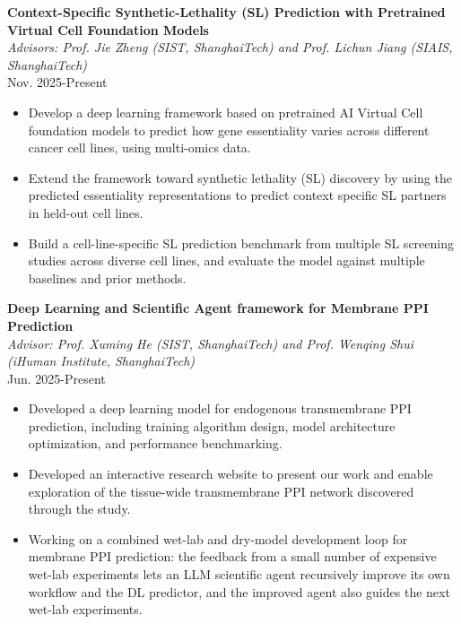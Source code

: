\documentclass[a4paper,9pt]{extarticle}
\begin{document}
\noindent\textbf{Context-Specific Synthetic-Lethality (SL) Prediction with Pretrained Virtual Cell Foundation Models}\\
\textit{Advisors: Prof. Jie Zheng (SIST, ShanghaiTech) and Prof. Lichun Jiang (SIAIS, ShanghaiTech)}\\
Nov. 2025-Present
\begin{itemize}
    \item Develop a deep learning framework based on pretrained AI Virtual Cell foundation models to predict how gene essentiality varies across different cancer cell lines, using multi-omics data.
    \item Extend the framework toward synthetic lethality (SL) discovery by using the predicted essentiality representations to predict context specific SL partners in held-out cell lines.
    \item Build a cell-line-specific SL prediction benchmark from multiple SL screening studies across diverse cell lines, and evaluate the model against multiple baselines and prior methods.
\end{itemize}

\noindent\textbf{Deep Learning and Scientific Agent framework for Membrane PPI Prediction}\\
\textit{Advisor: Prof. Xuming He (SIST, ShanghaiTech) and Prof. Wenqing Shui (iHuman Institute, ShanghaiTech)}\\
Jun. 2025-Present
\begin{itemize}
    \item Developed a deep learning model for endogenous transmembrane PPI prediction, including training algorithm design, model architecture optimization, and performance benchmarking.
    \item Developed an interactive research website to present our work and enable exploration of the tissue-wide transmembrane PPI network discovered through the study.
    \item Working on a combined wet-lab and dry-model development loop for membrane PPI prediction: the feedback from a small number of expensive wet-lab experiments lets an LLM scientific agent recursively improve its own workflow and the DL predictor, and the improved agent also guides the next wet-lab experiments.
\end{itemize}
\end{document}
